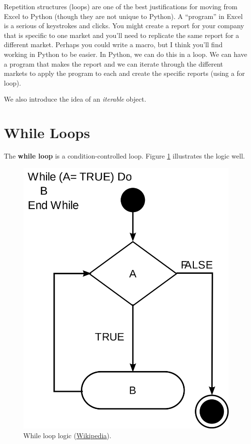 
Repetition structures (loops) are one of the best justifications for moving from Excel to Python (though they are not unique to Python). A ``program''
in Excel is a serious of keystrokes and clicks. You might create a report for your company that is specific to one
market and you'll need to replicate the same report for a different market. Perhaps you could write a macro, but
I think you'll find working in Python to be easier. In Python, we can do this in a loop. We can have a program that makes the report and we
can iterate through the different markets to apply the program to each and create the specific reports (using a for loop).

We also introduce the idea of an \emph{iterable} object. 


\section{While Loops}
 
The \textbf{while loop} is a condition-controlled loop. Figure \ref{fig:while} illustrates the logic well.

\begin{figure}[h!] 
\begin{center} 
\includegraphics[width = .55\textwidth]{while_loop.png}
\caption{While loop logic (\textcolor{blue}{\href{https://en.wikipedia.org/wiki/While\_loop}{Wikipedia}}).}
\label{fig:while}
\end{center}
\end{figure}


\smallskip

